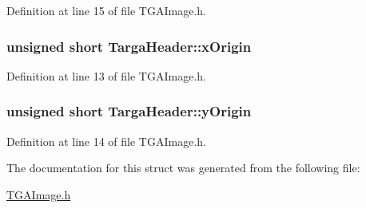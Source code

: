 Definition at line 15 of file T\-G\-A\-Image.\-h.

\hypertarget{struct_targa_header_af1e612255d864f0c4c7f0689313b1408}{
\subsubsection[{x\-Origin}]{\setlength{\rightskip}{0pt plus 5cm}unsigned short Targa\-Header\-::x\-Origin}}\label{struct_targa_header_af1e612255d864f0c4c7f0689313b1408}


Definition at line 13 of file T\-G\-A\-Image.\-h.

\hypertarget{struct_targa_header_aaf344ab9c2e3d4c2146d478274f84724}{
\subsubsection[{y\-Origin}]{\setlength{\rightskip}{0pt plus 5cm}unsigned short Targa\-Header\-::y\-Origin}}\label{struct_targa_header_aaf344ab9c2e3d4c2146d478274f84724}


Definition at line 14 of file T\-G\-A\-Image.\-h.



The documentation for this struct was generated from the following file\-:\begin{DoxyCompactItemize}
\item 
\hyperlink{_t_g_a_image_8h}{T\-G\-A\-Image.\-h}\end{DoxyCompactItemize}
